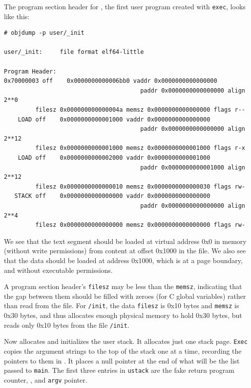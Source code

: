 The program section header for
,
the first user program created with
\lstinline{exec},
looks like this:
\begin{footnotesize}
\begin{verbatim}
# objdump -p user/_init

user/_init:     file format elf64-little

Program Header:
0x70000003 off    0x0000000000006bb0 vaddr 0x0000000000000000
                                       paddr 0x0000000000000000 align 2**0
         filesz 0x000000000000004a memsz 0x0000000000000000 flags r--
    LOAD off    0x0000000000001000 vaddr 0x0000000000000000
                                       paddr 0x0000000000000000 align 2**12
         filesz 0x0000000000001000 memsz 0x0000000000001000 flags r-x
    LOAD off    0x0000000000002000 vaddr 0x0000000000001000
                                       paddr 0x0000000000001000 align 2**12
         filesz 0x0000000000000010 memsz 0x0000000000000030 flags rw-
   STACK off    0x0000000000000000 vaddr 0x0000000000000000
                                       paddr 0x0000000000000000 align 2**4
         filesz 0x0000000000000000 memsz 0x0000000000000000 flags rw-
\end{verbatim}
\end{footnotesize}

We see that the text segment should be loaded at virtual address 0x0
in memory (without write permissions) from content at offset
0x1000 in the file. We also see that the data should be loaded at
address 0x1000, which is at a page boundary, and without executable
permissions.

A program section header's
\lstinline{filesz}
may be less than the
\lstinline{memsz},
indicating that the gap between them should be filled
with zeroes (for C global variables) rather than read from the file.
For
\lstinline{/init}, the data
\lstinline{filesz}
is 0x10 bytes and
\lstinline{memsz}
is 0x30 bytes,
and thus
allocates enough physical memory to hold 0x30 bytes, but reads only 0x10 bytes
from the file
\lstinline{/init}.

Now
allocates and initializes the user stack.
It allocates just one stack page.
\lstinline{Exec}
copies the argument strings to the top of the stack
one at a time, recording the pointers to them in
.
It places a null pointer at the end of what will be the
list passed to
\lstinline{main}.
The first three entries in
\lstinline{ustack}
are the fake return program counter,
,
and
\lstinline{argv}
pointer.

